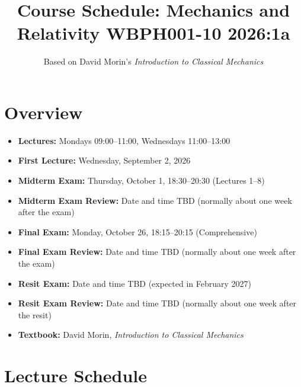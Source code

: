 \documentclass[12pt]{article}
\title{\textbf{Course Schedule: Mechanics and Relativity WBPH001-10 2026:1a}}
\author{Based on David Morin's \textit{Introduction to Classical Mechanics}}
\date{}
\begin{document}
\maketitle

\section*{Overview}
\begin{itemize}
  \item \textbf{Lectures:} Mondays 09:00--11:00, Wednesdays 11:00--13:00
  \item \textbf{First Lecture:} Wednesday, September 2, 2026
  \item \textbf{Midterm Exam:} Thursday, October 1, 18:30--20:30 (Lectures 1--8)
  \item \textbf{Midterm Exam Review:} Date and time TBD (normally about one week after the exam)
  \item \textbf{Final Exam:} Monday, October 26, 18:15--20:15 (Comprehensive)
  \item \textbf{Final Exam Review:} Date and time TBD (normally about one week after the exam)
  \item \textbf{Resit Exam:} Date and time TBD (expected in February 2027)
  \item \textbf{Resit Exam Review:} Date and time TBD (normally about one week after the resit)
  \item \textbf{Textbook:} David Morin, \textit{Introduction to Classical Mechanics}
\end{itemize}


\newpage

\section*{Lecture Schedule}
\end{document}

